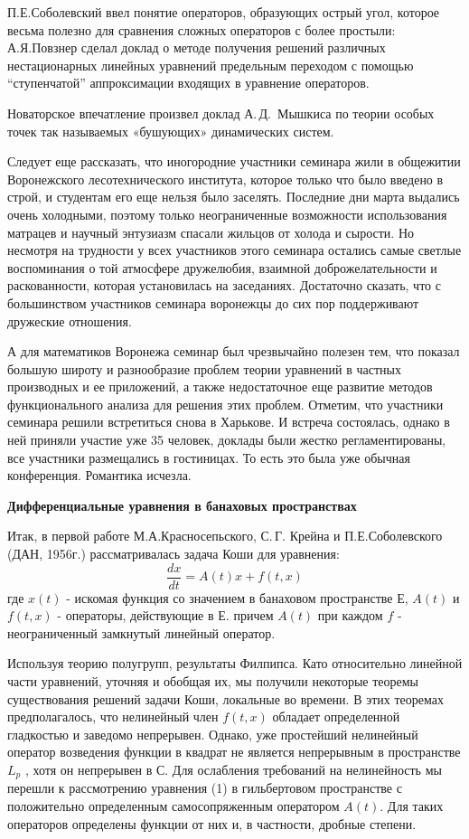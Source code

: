 П.Е.Соболевский ввел понятие операторов, образующих острый угол,  которое весьма полезно для сравнения сложных операторов с более простыли: А.Я.Повзнер сделал доклад о методе получения решений различных нестационарных линейных уравнений предельным переходом с помощью “ступенчатой”  аппроксимации входящих в уравнение операторов.

Новаторское впечатление произвел доклад А.\,Д.~Мышкиса по теории особых точек так называемых «бушующих» динамических систем.

 	Следует еще рассказать, что иногородние участники семинара жили в общежитии Воронежского лесотехнического института, которое только что было введено в строй, и студентам его еще нельзя было заселять. Последние дни марта выдались очень холодными, поэтому только неограниченные возможности использования матрацев и научный энтузиазм спасали жильцов от холода и сырости. Но несмотря на трудности у всех участников этого семинара остались самые светлые воспоминания о той атмосфере дружелюбия, взаимной доброжелательности и раскованности, которая установилась на заседаниях. Достаточно сказать, что с большинством участников семинара воронежцы до сих пор поддерживают дружеские отношения.

А для математиков Воронежа семинар был чрезвычайно полезен тем, что показал большую широту и разнообразие проблем теории уравнений в       частных производных и ее приложений, а также недостаточное еще развитие методов функционального анализа для решения этих проблем.
Отметим, что участники семинара решили встретиться снова в Харькове. И встреча состоялась, однако в ней приняли участие уже 35 человек, доклады были жестко регламентированы, все участники размещались в гостиницах. То есть это была уже обычная конференция. Романтика исчезла.

{\bf Дифференциальные уравнения в банаховых пространствах}

Итак, в первой работе М.А.Красносепьского, С.\,Г. Крейна и П.Е.Соболевского (ДАН, 1956г.) рассматривалась задача Коши для уравнения:
$$\frac{dx}{dt} = A(t)x + f(t, x)$$
где $x(t)$ - искомая функция со значением в банаховом пространстве $Е$, $A(t)$ и $f(t,x)$ - операторы, действующие в $Е$. причем $A(t)$ при каждом $f$ - неограниченный замкнутый линейный оператор.

Используя теорию полугрупп, результаты Филпипса. Като относительно линейной части уравнений, уточняя и обобщая их, мы получили некоторые теоремы существования решений задачи Коши, локальные во времени. В этих теоремах предполагалось, что нелинейный член $f(t,x)$ обладает определенной гладкостью и заведомо непрерывен. Однако, уже простейший нелинейный оператор возведения функции в квадрат не является непрерывным в пространстве $L_p$ , хотя он непрерывен в С. Для ослабления требований на нелинейность мы перешли к рассмотрению уравнения (1) в гильбертовом пространстве с положительно определенным самосопряженным оператором $A(t)$. Для таких операторов определены функции от них и, в частности, дробные степени.

